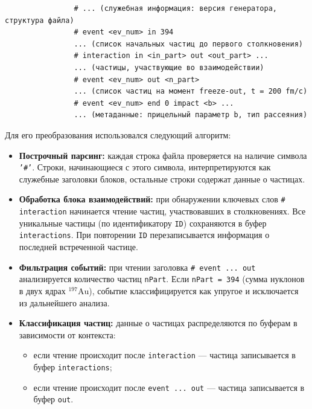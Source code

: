 \documentclass[a4paper]{extarticle}
\begin{document}
            \begin{verbatim}
                # ... (служебная информация: версия генератора, структура файла)
                # event <ev_num> in 394
                ... (список начальных частиц до первого столкновения)
                # interaction in <in_part> out <out_part> ...
                ... (частицы, участвующие во взаимодействии)
                # event <ev_num> out <n_part>
                ... (список частиц на момент freeze-out, t = 200 fm/c)
                # event <ev_num> end 0 impact <b> ...
                ... (метаданные: прицельный параметр b, тип рассеяния)
            \end{verbatim}

            Для его преобразования использовался следующий алгоритм:

            \begin{itemize}
                \item \textbf{Построчный парсинг:} 
                    каждая строка файла проверяется на наличие символа \texttt{'\#'}. 
                    Строки, начинающиеся с этого символа, 
                    интерпретируются как служебные заголовки блоков, 
                    остальные строки содержат данные о частицах.

                \item \textbf{Обработка блока взаимодействий:} 
                    при обнаружении ключевых слов \texttt{\# interaction} 
                    начинается чтение частиц, участвовавших в столкновениях. 
                    Все уникальные частицы (по идентификатору \texttt{ID}) 
                    сохраняются в буфер \texttt{interactions}. 
                    При повторении \texttt{ID} перезаписывается информация 
                    о последней встреченной частице.

                \item \textbf{Фильтрация событий:} 
                    при чтении заголовка \texttt{\# event ... out} 
                    анализируется количество частиц \texttt{nPart}. 
                    Если \texttt{nPart = 394} (сумма нуклонов в двух ядрах $^{197}\text{Au}$), 
                    событие классифицируется как упругое и исключается из дальнейшего анализа.

                \item \textbf{Классификация частиц:} 
                    данные о частицах распределяются по буферам в зависимости от контекста:
                    \begin{itemize}
                        \item 
                            если чтение происходит после \texttt{interaction} 
                            --- частица записывается в буфер \texttt{interactions};
                        \item 
                            если чтение происходит после \texttt{event ... out} 
                            --- частица записывается в буфер \texttt{out}.
                    \end{itemize}


\end{itemize}
\end{document}

